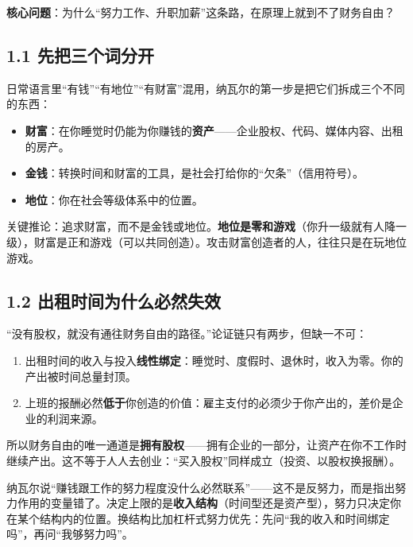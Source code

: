 \documentclass[UTF8,a4paper,11pt]{ctexart}
\begin{document}
\textbf{核心问题}：为什么“努力工作、升职加薪”这条路，在原理上就到不了财务自由？

\subsection*{1.1 先把三个词分开}

日常语言里“有钱”“有地位”“有财富”混用，纳瓦尔的第一步是把它们拆成三个不同的东西：

\begin{keyconcept}[财富、金钱、地位]
\begin{itemize}
  \item \textbf{财富}：在你睡觉时仍能为你赚钱的\textbf{资产}——企业股权、代码、媒体内容、出租的房产。
  \item \textbf{金钱}：转换时间和财富的工具，是社会打给你的“欠条”（信用符号）。
  \item \textbf{地位}：你在社会等级体系中的位置。
\end{itemize}
关键推论：追求财富，而不是金钱或地位。\textbf{地位是零和游戏}（你升一级就有人降一级），财富是正和游戏（可以共同创造）。攻击财富创造者的人，往往只是在玩地位游戏。
\end{keyconcept}

\subsection*{1.2 出租时间为什么必然失效}

“没有股权，就没有通往财务自由的路径。”论证链只有两步，但缺一不可：

\begin{enumerate}
  \item 出租时间的收入与投入\textbf{线性绑定}：睡觉时、度假时、退休时，收入为零。你的产出被时间总量封顶。
  \item 上班的报酬必然\textbf{低于}你创造的价值：雇主支付的必须少于你产出的，差价是企业的利润来源。
\end{enumerate}

所以财务自由的唯一通道是\textbf{拥有股权}——拥有企业的一部分，让资产在你不工作时继续产出。这不等于人人去创业：“买入股权”同样成立（投资、以股权换报酬）。

\begin{calcbox}
纳瓦尔说“赚钱跟工作的努力程度没什么必然联系”——这不是反努力，而是指出努力作用的变量错了。决定上限的是\textbf{收入结构}（时间型还是资产型），努力只决定你在某个结构内的位置。换结构比加杠杆式努力优先：先问“我的收入和时间绑定吗”，再问“我够努力吗”。
\end{calcbox}
\end{document}
